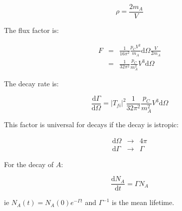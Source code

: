 \[
  \rho = \frac{2m_A}{V}
\]

The flux factor is:

\begin{eqnarray*}
  F & = & \frac{1}{16\pi^2}\frac{p_CV^2}{m_A}\mathrm{d}\Omega\frac{V}{2m_A} \\
    & = & \frac{1}{32\pi^2}\frac{p_C}{m_A^2}V^3\mathrm{d}\Omega
\end{eqnarray*}

The decay rate is:

\[
  \frac{\mathrm{d}\Gamma}{\mathrm{d}\Omega} = |T_{fi}|^2\frac{1}{32\pi^2}\frac{p_C}{m_A^2}V^3\mathrm{d}\Omega
\]


This factor is universal for decays if the decay is istropic:

\begin{eqnarray*}
  \mathrm{d}\Omega & \to & 4\pi \\
  \mathrm{d}\Gamma & \to & \Gamma
\end{eqnarray*}

For the decay of $A$:

\[
  \frac{\mathrm{d}N_A}{\mathrm{d}t} = \Gamma N_A
\]

ie $N_A(t) = N_A(0)e^{-\Gamma t}$ and $\Gamma^{-1}$ is the mean lifetime.
